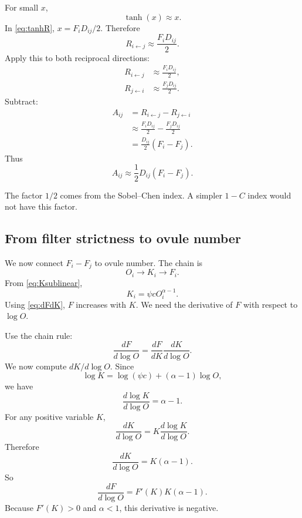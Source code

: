 \documentclass[12pt]{article}
\begin{document}
For small $x$,
\begin{equation}
\tanh(x)\approx x.
\end{equation}
In \eqref{eq:tanhR}, $x=F_iD_{ij}/2$. Therefore
\begin{equation}
R_{i\leftarrow j}\approx \frac{F_iD_{ij}}{2}.
\label{eq:Rlin}
\end{equation}
Apply this to both reciprocal directions:
\begin{align}
R_{i\leftarrow j}&\approx \frac{F_iD_{ij}}{2},\\
R_{j\leftarrow i}&\approx \frac{F_jD_{ij}}{2}.
\end{align}
Subtract:
\begin{align}
A_{ij}
&=R_{i\leftarrow j}-R_{j\leftarrow i} \\
&\approx \frac{F_iD_{ij}}{2}-\frac{F_jD_{ij}}{2} \\
&=\frac{D_{ij}}{2}(F_i-F_j).
\end{align}
Thus
\begin{equation}
\boxed{A_{ij}\approx \frac{1}{2}D_{ij}(F_i-F_j)}.
\label{eq:Alin}
\end{equation}

\begin{conclusionbox}
The factor $1/2$ comes from the Sobel--Chen index. A simpler $1-C$ index would not have this factor.
\end{conclusionbox}

\subsection{From filter strictness to ovule number}

We now connect $F_i-F_j$ to ovule number. The chain is
\begin{equation}
O_i \rightarrow K_i \rightarrow F_i.
\end{equation}
From \eqref{eq:Ksublinear},
\begin{equation}
K_i=\psi cO_i^{\alpha-1}.
\end{equation}
Using \eqref{eq:dFdK}, $F$ increases with $K$. We need the derivative of $F$ with respect to $\log O$.

Use the chain rule:
\begin{equation}
\frac{dF}{d\log O}=\frac{dF}{dK}\frac{dK}{d\log O}.
\end{equation}
We now compute $dK/d\log O$. Since
\begin{equation}
\log K=\log(\psi c)+(\alpha-1)\log O,
\end{equation}
we have
\begin{equation}
\frac{d\log K}{d\log O}=\alpha-1.
\end{equation}
For any positive variable $K$,
\begin{equation}
\frac{dK}{d\log O}=K\frac{d\log K}{d\log O}.
\end{equation}
Therefore
\begin{equation}
\frac{dK}{d\log O}=K(\alpha-1).
\end{equation}
So
\begin{equation}
\frac{dF}{d\log O}=F'(K)K(\alpha-1).
\label{eq:dFdlogO}
\end{equation}
Because $F'(K)>0$ and $\alpha<1$, this derivative is negative.
\end{document}
